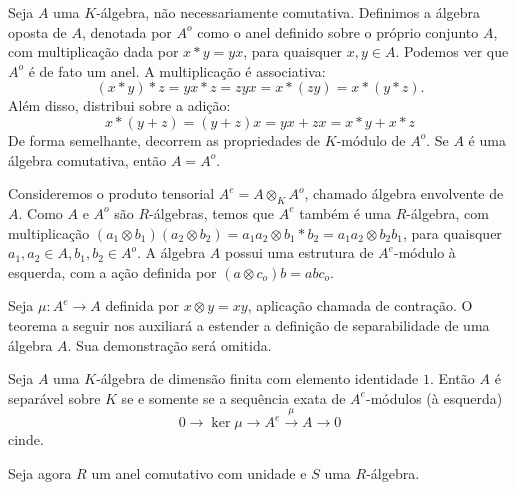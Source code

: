 Seja $A$ uma $K$-álgebra, não necessariamente comutativa. Definimos a álgebra oposta de $A$, denotada por $A^{o}$ como o anel definido sobre o próprio conjunto $A$, com multiplicação dada por $x*y = yx$, para quaisquer $x,y \in A$. Podemos ver que $A^o$ é de fato um anel. A multiplicação é associativa:
\[(x*y)*z = yx*z = zyx = x*(zy) = x*(y*z).\]
Além disso, distribui sobre a adição:
\[x*(y+z) = (y+z)x = yx+zx = x*y + x*z\]
De forma semelhante, decorrem as propriedades de $K$-módulo de $A^o$. Se $A$ é uma álgebra comutativa, então $A=A^o$. \par 
Consideremos o produto tensorial $A^e=A\otimes_K A^o$, chamado álgebra envolvente\label{def:algenv} de $A$. Como $A$ e $A^o$ são $R$-álgebras, temos que $A^e$ também é uma $R$-álgebra, com multiplicação $(a_1\otimes b_1)(a_2 \otimes b_2) = a_1a_2 \otimes b_1 * b_2 = a_1 a_2 \otimes b_2b_1$, para quaisquer $a_1,a_2 \in A, b_1,b_2 \in A^o$. A álgebra $A$ possui uma estrutura de $A^e$-módulo à esquerda, com a ação definida por $(a\otimes c_o)b = abc_o$. \par
Seja $\mu:A^e \rightarrow A$ definida por $x\otimes y = xy$, aplicação chamada de contração. O teorema a seguir nos auxiliará a estender a definição de separabilidade de uma álgebra $A$. Sua demonstração será omitida.



\begin{teo} \label{teo:sep-seq}
Seja $A$ uma $K$-álgebra de dimensão finita com elemento identidade $1$. Então $A$ é separável sobre $K$ se e somente se a sequência exata de $A^e$-módulos (à esquerda)\[0 \rightarrow \ker\mu \rightarrow A^e \xrightarrow{\mu} A \rightarrow 0\]cinde.
\end{teo}


Seja agora $R$ um anel comutativo com unidade e $S$ uma $R$-álgebra.

